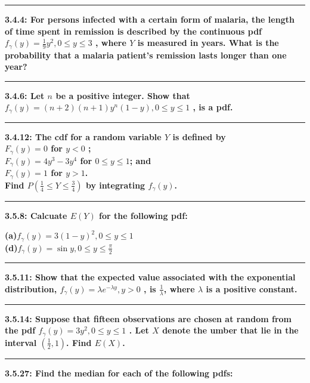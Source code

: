 \documentclass[11pt]{article}
\newcommand\question[2]{\vspace{.25in}\hrule\textbf{#1: #2}\vspace{.5em}\vspace{.10in}}
\renewcommand\part[1]{\vspace{.10in}\textbf{(#1)}}
\begin{document}
\raggedright
\newcommand\NAME{Jonathan Lopez}  %
\newcommand\HWNUM{3}              %



\question{3.4.4}
{For persons infected with a certain form of malaria, the length of time spent in
remission is described by the continuous pdf 
$f_{\gamma} (y) = \frac{1}{9}y^{2},0 \leq y \leq 3$
, where $Y$ is measured in years. What is the probability that a malaria patient's
remission lasts longer than one year?}


\question{3.4.6}
{Let $n$ be a positive integer. Show that
$f_{\gamma} (y) = (n+2)(n+1)y^{n}(1-y),0 \leq y \leq 1$
, is a pdf.}


\question{3.4.12}
{The cdf for a random variable $Y$ is defined by \\
$F_{\gamma} (y) = 0$ for $y < 0$ ;\\
$F_{\gamma} (y) = 4y^{3}-3y^{4}$ for $0 \leq y \leq 1$; and \\
$F_{\gamma} (y) = 1$ for $y > 1$.\\
Find 
$P(\frac{1}{4} \leq Y \leq \frac{3}{4})$
by integrating $f_{\gamma} (y)$.
}


\question{3.5.8}
{Calcuate $E(Y)$ for the following pdf:}

\part{a}$f_{\gamma} (y) = 3(1-y)^{2}, 0 \leq y \leq 1$
\\
\part{d}$f_{\gamma} (y) = \sin y, 0 \leq y \leq \frac{\pi}{2}$


\question{3.5.11}
{Show that the expected value associated with the exponential distribution,
$f_{\gamma} (y) = \lambda e^{- \lambda y},y > 0$
, is $\frac{1}{\lambda}$, where $\lambda$ is a positive constant.}


\question{3.5.14}
{Suppose that fifteen observations are chosen at random from the pdf 
$f_{\gamma} (y) = 3y^{2}, 0 \leq y \leq 1$
. Let $X$ denote the umber that lie in the interval 
$(\frac{1}{2}, 1)$. Find $E(X)$.}


\question{3.5.27}
{Find the median for each of the following pdfs:}
\end{document}
